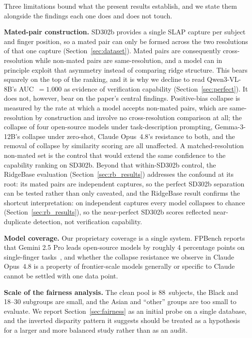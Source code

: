 \documentclass[journal]{IEEEtran}
\begin{document}
Three limitations bound what the present results establish, and we state
them alongside the findings each one does and does not touch.

\textbf{Mated-pair construction.}
SD302b provides a single SLAP capture per subject and finger position, so a
mated pair can only be formed across the two resolutions of that one
capture (Section~\ref{sec:dataset}). Mated pairs are consequently
cross-resolution while non-mated pairs are same-resolution, and a model can
in principle exploit that asymmetry instead of comparing ridge structure.
This bears squarely on the top of the ranking, and it is why we decline to
read Qwen3-VL-8B's AUC~$= 1.000$ as evidence of verification capability
(Section~\ref{sec:perfect}). It does not, however, bear on the paper's
central findings. Positive-bias collapse is measured by the rate at which a
model accepts non-mated pairs, which are same-resolution by construction
and involve no cross-resolution comparison at all; the collapse of four
open-source models under task-description prompting, Gemma-3-12B's collapse
under zero-shot, Claude Opus~4.8's resistance to both, and the removal of
collapse by similarity scoring are all unaffected. A matched-resolution
non-mated set is the control that would extend the same confidence to the
capability ranking on SD302b. Beyond that within-SD302b control, the RidgeBase
evaluation (Section~\ref{sec:rb_results}) addresses the confound at its root:
its mated pairs are independent captures, so the perfect SD302b separation can
be tested rather than only caveated, and the RidgeBase result confirms the
shortcut interpretation: on independent captures every model collapses to
chance (Section~\ref{sec:rb_results}), so the near-perfect SD302b scores
reflected near-duplicate detection, not verification capability.

\textbf{Model coverage.}
Our proprietary coverage is a single system. FPBench reports that Gemini
2.5 Pro leads open-source models by roughly 4 percentage points on
single-finger tasks~\cite{fpbench2025}, and whether the collapse resistance
we observe in Claude Opus~4.8 is a property of frontier-scale models
generally or specific to Claude cannot be settled with one data point.

\textbf{Scale of the fairness analysis.}
The clean pool is 88~subjects, the Black and 18--30 subgroups are small,
and the Asian and ``other'' groups are too small to evaluate. We report
Section~\ref{sec:fairness} as an initial probe on a single database, and
the inverted disparity pattern it suggests should be treated as a
hypothesis for a larger and more balanced study rather than as an audit.
\end{document}
